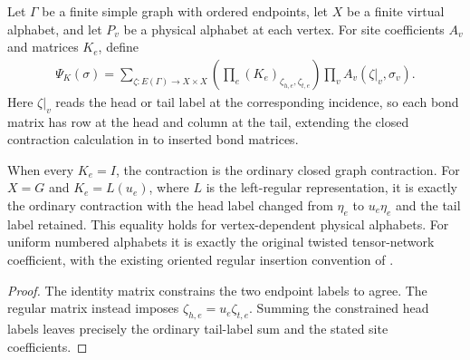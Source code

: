 \begin{definition}%
    \label{def:peps_graph_inserted_bond_state}
    \leanok
    Let $\Gamma$ be a finite simple graph with ordered endpoints, let $X$ be
    a finite virtual alphabet, and let $P_v$ be a physical alphabet at each
    vertex. For site coefficients $A_v$ and matrices $K_e$, define
    \begin{align}
        \Psi_K(\sigma)
        =\sum_{\zeta:E(\Gamma)\to X\times X}
        \left(\prod_e(K_e)_{\zeta_{h,e},\zeta_{t,e}}\right)
        \prod_v A_v(\zeta|_v,\sigma_v).
    \end{align}
    Here $\zeta|_v$ reads the head or tail label at the corresponding incidence,
    so each bond matrix has row at the head and column at the tail, extending
    the closed contraction calculation in \cite[Section~7]{Schuch2010PEPS} to
    inserted bond matrices.
\end{definition}

\begin{lemma}%
    \label{thm:peps_graph_inserted_bond_recovery}
    \leanok
    When every $K_e=I$, the contraction is the ordinary closed graph
    contraction. For $X=G$ and $K_e=L(u_e)$, where $L$ is the left-regular
    representation, it is exactly the ordinary contraction with the head
    label changed from $\eta_e$ to $u_e\eta_e$ and the tail label retained.
    This equality holds for vertex-dependent physical alphabets. For uniform
    numbered alphabets it is exactly the original twisted tensor-network
    coefficient, with the existing oriented regular insertion convention of
    \cite[Section~6.4]{Schuch2010PEPS}.
\end{lemma}

\begin{proof}\leanok
    The identity matrix constrains the two endpoint labels to agree.
    The regular matrix instead imposes $\zeta_{h,e}=u_e\zeta_{t,e}$.
    Summing the constrained head labels leaves precisely the ordinary
    tail-label sum and the stated site coefficients.
\end{proof}

